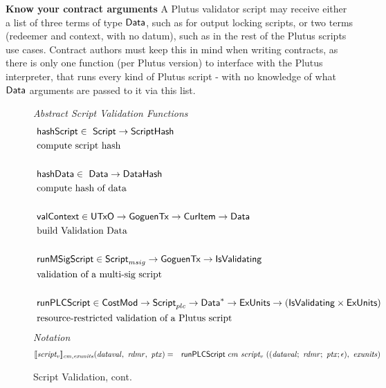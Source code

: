 \begin{note}
  \textbf{Know your contract arguments}
A Plutus validator script may receive either a list of three terms of type $\mathsf{Data}$,
such as for output locking scripts, or two terms (redeemer and context, with
no datum), such as in the rest of the Plutus scripts use cases.
Contract authors must keep this in mind when writing contracts, as there is
only one function (per Plutus version) to interface with the Plutus interpreter,
that runs every kind of Plutus script - with no knowledge of what $\mathsf{Data}$ arguments
are passed to it via this list.
\end{note}

\begin{figure*}[htb]
  \emph{Abstract Script Validation Functions}
  \begin{align*}
     &\mathsf{hashScript} \in  ~\mathsf{Script}\to \mathsf{ScriptHash} \\
     &\text{compute script hash} \\~\\
     &\mathsf{hashData} \in  ~\mathsf{Data} \to \mathsf{DataHash} \\
     &\text{compute hash of data} \\~\\
     &\mathsf{valContext} \in  \mathsf{UTxO} \to \mathsf{GoguenTx} \to \mathsf{CurItem} \to \mathsf{Data} \\
     &\text{build Validation Data} \\~\\
     &\mathsf{runMSigScript} \in\mathsf{Script}_{msig}\to \mathsf{GoguenTx} \to \mathsf{IsValidating}  \\
     &\text{validation of a multi-sig script} \\~\\
     &\mathsf{runPLCScript} \in \mathsf{CostMod} \to\mathsf{Script}_{plc} \to
    \mathsf{Data}^{*} \to \mathsf{ExUnits} \to (\mathsf{IsValidating} \times \mathsf{ExUnits}) \\
     &\text{resource-restricted validation of a Plutus script}
  \end{align*}
  \emph{Notation}
  \begin{align*}
    \llbracket \mathit{script_v} \rrbracket_{\mathit{cm},\mathit{exunits}}(\mathit{dataval},~\mathit{rdmr},~\mathit{ptx})
    &=& \mathsf{runPLCScript} ~{cm}~\mathit{script_v}~((\mathit{dataval};~\mathit{rdmr};~\mathit{ptx};\epsilon),~
    \mathit{exunits})
  \end{align*}
  \caption{Script Validation, cont.}
  \label{fig:defs:functions-valid}
\end{figure*}


\clearpage
